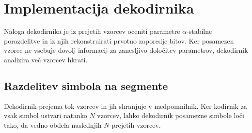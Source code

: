 \documentclass[a4paper, 12pt, openany]{book}
\begin{document}
\section{Implementacija dekodirnika}
Naloga dekodirnika je iz prejetih vzorcev oceniti parametre $\alpha$-stabilne porazdelitve in iz njih rekonstruirati prvotno zaporedje bitov. Ker posamezen vzorec ne vsebuje dovolj informacij za zanesljivo določitev parametrov, dekodirnik analizira več vzorcev hkrati.

\subsection{Razdelitev simbola na segmente}
Dekodirnik prejema tok vzorcev in jih shranjuje v medpomnilnik. Ker kodirnik za vsak simbol ustvari natanko $N$ vzorcev, lahko dekodirnik posamezne simbole loči tako, da vedno obdela naslednjih $N$ prejetih vzorcev.
\end{document}
